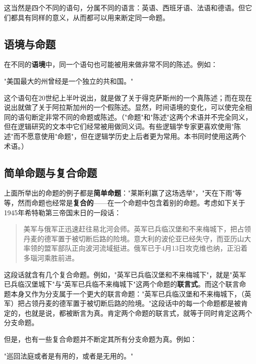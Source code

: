 这当然是四个不同的语句，分属不同的语言：英语、西班牙语、法语和德语。但它们都具有同样的意义，从而都可以用来断定同一命题。

\subsection{语境与命题}

在不同的\textbf{语境}中，同一个语句也可能被用来做非常不同的陈述。例如：

\begin{center}
"美国最大的州曾经是一个独立的共和国。"
\end{center}

这个语句在20世纪上半叶说出，就是做了关于得克萨斯州的一个真陈述；而在现在说出就做了关于阿拉斯加州的一个假陈述。显然，时间语境的变化，可以使完全相同的语句断定非常不同的命题或陈述。（"命题"和"陈述"这两个术语并不完全同义，但在逻辑研究的文本中它们经常被用做同义词。有些逻辑学专家更喜欢使用"陈述"而不愿意使用"命题"，但在逻辑学历史上后者更为常用。本书同时使用这两个术语。）

\subsection{简单命题与复合命题}

上面所举出的命题的例子都是\textbf{简单命题}："莱斯利赢了这场选举"，"天在下雨"等等，然而命题也经常是\textbf{复合的}——在一个命题中包含着别的命题。考虑如下关于1945年希特勒第三帝国末日的一段话：

\begin{quotation}
美军与俄军正迅速赶往易北河会师。英军已兵临汉堡和不来梅城下，把占领丹麦的德军置于被切断后路的险境。意大利的波伦亚已经失守，而亚历山大率领的盟军部队正向波河流域挺进。俄军已于4月13日攻克维也纳，正沿着多瑙河乘胜前进。\cite{shirer1960}
\end{quotation}

这段话就含有几个复合命题。例如，"英军已兵临汉堡和不来梅城下"，就是"英军已兵临汉堡城下"与"英军已兵临不来梅城下"这两个命题的\textbf{联言式}。而这个联言命题本身又作为分支属于一个更大的联言命题："英军已兵临汉堡和不来梅城下，（英军）把占领丹麦的德军置于被切断后路的险境。"这段话中的每一个命题都是被肯定的，也就是说，都被断言为真。肯定两个命题的联言式，就等于同时肯定这两个分支命题。

但是，也有一些复合命题并不断定其所有分支命题为真。例如：

\begin{center}
"巡回法庭或者是有用的，或者是无用的。"\cite{lincoln1861}
\end{center}

